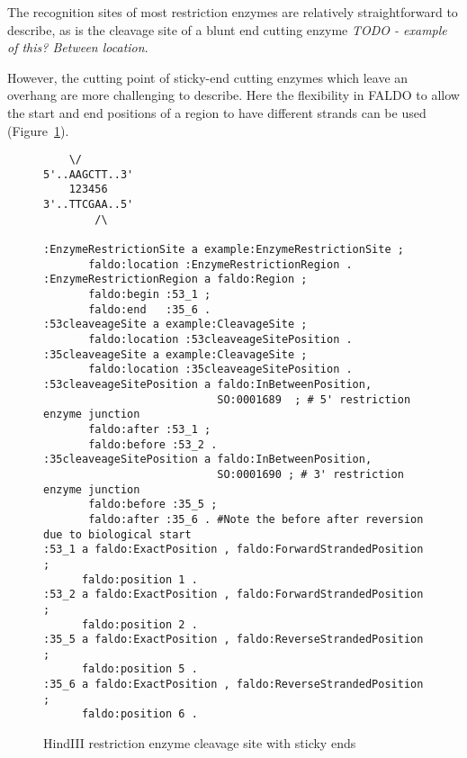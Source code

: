 The recognition sites of most restriction enzymes are relatively
straightforward to describe, as is the cleavage site of a blunt
end cutting enzyme \textit{TODO - example of this? Between location}.

However, the cutting point of sticky-end cutting enzymes which
leave an overhang are more challenging to describe. Here the
flexibility in FALDO to allow the start and end positions of a region
to have different strands can be used (Figure~\ref{fig:HindIII}).

\begin{figure}
\begin{shaded}
\small
\begin{verbatim}
    \/
5'..AAGCTT..3' 
    123456
3'..TTCGAA..5'
        /\
        
:EnzymeRestrictionSite a example:EnzymeRestrictionSite ;
       faldo:location :EnzymeRestrictionRegion .
:EnzymeRestrictionRegion a faldo:Region ;
       faldo:begin :53_1 ;
       faldo:end   :35_6 .
:53cleaveageSite a example:CleavageSite ;
       faldo:location :53cleaveageSitePosition .
:35cleaveageSite a example:CleavageSite ;
       faldo:location :35cleaveageSitePosition .
:53cleaveageSitePosition a faldo:InBetweenPosition, 
                           SO:0001689  ; # 5' restriction enzyme junction 
       faldo:after :53_1 ;        
       faldo:before :53_2 .
:35cleaveageSitePosition a faldo:InBetweenPosition, 
                           SO:0001690 ; # 3' restriction enzyme junction 
       faldo:before :35_5 ;
       faldo:after :35_6 . #Note the before after reversion due to biological start      
:53_1 a faldo:ExactPosition , faldo:ForwardStrandedPosition ;
      faldo:position 1 .
:53_2 a faldo:ExactPosition , faldo:ForwardStrandedPosition ;
      faldo:position 2 .
:35_5 a faldo:ExactPosition , faldo:ReverseStrandedPosition ;
      faldo:position 5 .
:35_6 a faldo:ExactPosition , faldo:ReverseStrandedPosition ;
      faldo:position 6 .
\end{verbatim}
\end{shaded}
\caption{HindIII restriction enzyme cleavage site with sticky ends}
\label{fig:HindIII}
\end{figure}





